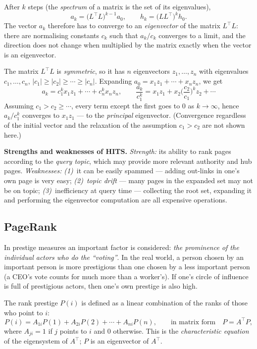 \documentclass[11pt,a4paper]{article}
\theoremstyle{definition}
\providecommand{\uv}[1]{``#1''}
\begin{document}
\begin{defbox}
After $k$ steps (the \emph{spectrum} of a matrix is the set of its eigenvalues),
\[ a_k=\big(L^{\!\top}L\big)^{k-1}a_0,\qquad h_k=\big(LL^{\!\top}\big)^{k}h_0. \]
The vector $a_k$ therefore has to converge to an \emph{eigenvector} of the matrix $L^{\!\top}L$:
there are normalising constants $c_k$ such that $a_k/c_k$ converges to a limit, and the direction
does not change when multiplied by the matrix exactly when the vector is an eigenvector.

The matrix $L^{\!\top}L$ is \emph{symmetric}, so it has $n$ eigenvectors $z_1,\dots,z_n$ with
eigenvalues $c_1,\dots,c_n$, $|c_1|\ge|c_2|\ge\cdots\ge|c_n|$. Expanding
$a_0=x_1z_1+\cdots+x_nz_n$, we get
\[ a_k=c_1^{k}x_1z_1+\cdots+c_n^{k}x_nz_n,\qquad
   \frac{a_k}{c_1^{k}}=x_1z_1+x_2\Big(\frac{c_2}{c_1}\Big)^{\!k}z_2+\cdots \]
Assuming $c_1>c_2\ge\cdots$, every term except the first goes to 0 as $k\to\infty$, hence
$a_k/c_1^k$ converges to $x_1z_1$ --- to the \emph{principal} eigenvector. (Convergence regardless of
the initial vector and the relaxation of the assumption $c_1>c_2$ are not shown here.)
\end{defbox}

\textbf{Strengths and weaknesses of HITS.} \emph{Strength:} its ability to rank pages according to the
\emph{query topic}, which may provide more relevant authority and hub pages. \emph{Weaknesses:}
\emph{(1)}~it can be easily spammed --- adding out-links in one's own page is very easy;
\emph{(2)}~\emph{topic drift} --- many pages in the expanded set may not be on topic;
\emph{(3)}~inefficiency at query time --- collecting the root set, expanding it and performing the
eigenvector computation are all expensive operations.

\subsection{PageRank}
\label{ssec:pagerank}

\begin{defbox}
In prestige measures an important factor is considered: \emph{the prominence of the individual actors
who do the \uv{voting}}. In the real world, a person chosen by an important person is more prestigious
than one chosen by a less important person (a CEO's vote counts for much more than a worker's). If
one's circle of influence is full of prestigious actors, then one's own prestige is also high.

The rank prestige $P(i)$ is defined as a linear combination of the ranks of those who point to $i$:
\[ P(i)=A_{1i}P(1)+A_{2i}P(2)+\cdots+A_{ni}P(n),\qquad\text{in matrix form}\quad P=A^{\!\top}P, \]
where $A_{ji}=1$ if $j$ points to $i$ and 0 otherwise. This is the \emph{characteristic equation} of
the eigensystem of $A^{\!\top}$; $P$ is an eigenvector of $A^{\!\top}$.
\end{defbox}
\end{document}
